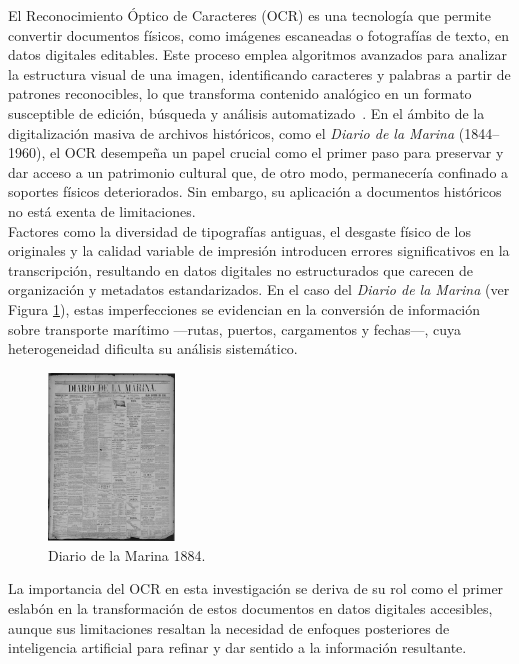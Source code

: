 El Reconocimiento Óptico de Caracteres (OCR) es una tecnología que permite convertir documentos físicos, como imágenes escaneadas o fotografías de texto, en datos digitales editables. Este proceso emplea algoritmos avanzados para analizar la estructura visual de una imagen, identificando caracteres y palabras a partir de patrones reconocibles, lo que transforma contenido analógico en un formato susceptible de edición, búsqueda y análisis automatizado~\cite{piryani2025multilocraqa}. En el ámbito de la digitalización masiva de archivos históricos, como el \textit{Diario de la Marina} (1844–1960), el OCR desempeña un papel crucial como el primer paso para preservar y dar acceso a un patrimonio cultural que, de otro modo, permanecería confinado a soportes físicos deteriorados.
Sin embargo, su aplicación a documentos históricos no está exenta de limitaciones.\\ 
Factores como la diversidad de tipografías antiguas, el desgaste físico de los originales y la calidad variable de impresión introducen errores significativos en la transcripción, resultando en datos digitales no estructurados que carecen de organización y metadatos estandarizados. En el caso del \textit{Diario de la Marina} (ver Figura \ref{fig:Diario de la Marina 1884}), estas imperfecciones se evidencian en la conversión de información sobre transporte marítimo —rutas, puertos, cargamentos y fechas—, cuya heterogeneidad dificulta su análisis sistemático.

\begin{figure}[h]
	\centering
	\includegraphics[width=0.3\textwidth]{images/diario}
	\caption{Diario de la Marina 1884.}
	\label{fig:Diario de la Marina 1884}
\end{figure}

La importancia del OCR en esta investigación se deriva de su rol como el primer eslabón en la transformación de estos documentos en datos digitales accesibles, aunque sus limitaciones resaltan la necesidad de enfoques posteriores de inteligencia artificial para refinar y dar sentido a la información resultante.

